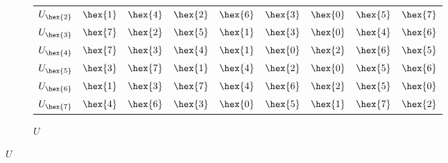 {\begin{figure}
\begin{subfigure}{0.32\textwidth}
\begin{tabular}{l|rrrrrrrr}
$U_{\hex{2}}$ & $\hex{1}$ & $\hex{4}$ & $\hex{2}$ & $\hex{6}$ & $\hex{3}$ & $\hex{0}$ & $\hex{5}$ & $\hex{7}$\\
$U_{\hex{3}}$ & $\hex{7}$ & $\hex{2}$ & $\hex{5}$ & $\hex{1}$ & $\hex{3}$ & $\hex{0}$ & $\hex{4}$ & $\hex{6}$\\
$U_{\hex{4}}$ & $\hex{7}$ & $\hex{3}$ & $\hex{4}$ & $\hex{1}$ & $\hex{0}$ & $\hex{2}$ & $\hex{6}$ & $\hex{5}$\\
$U_{\hex{5}}$ & $\hex{3}$ & $\hex{7}$ & $\hex{1}$ & $\hex{4}$ & $\hex{2}$ & $\hex{0}$ & $\hex{5}$ & $\hex{6}$\\
$U_{\hex{6}}$ & $\hex{1}$ & $\hex{3}$ & $\hex{7}$ & $\hex{4}$ & $\hex{6}$ & $\hex{2}$ & $\hex{5}$ & $\hex{0}$\\
$U_{\hex{7}}$ & $\hex{4}$ & $\hex{6}$ & $\hex{3}$ & $\hex{0}$ & $\hex{5}$ & $\hex{1}$ & $\hex{7}$ & $\hex{2}$\\
      \end{tabular}
      \caption{$U$}
    \end{subfigure}
  \end{figure}
}